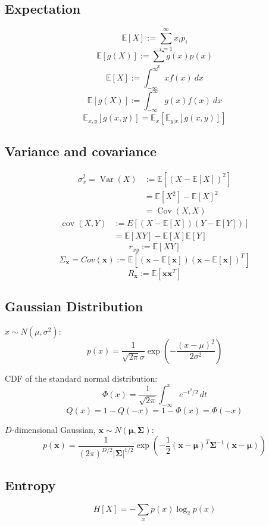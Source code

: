\documentclass{article}
\begin{document}
\begin{multicols}{2}
\subsection{Expectation}
\[\mathbb{E}[X] := \sum_{i=1}^\infty x_i p_i\]
\[\mathbb{E}[g(X)] := \sum_{x} g(x) p(x)\]
\[\mathbb{E}[X] := \int_{-\infty}^\infty x f(x)\ dx\]
\[\mathbb{E}[g(X)] := \int_{-\infty}^\infty g(x) f(x)\ dx\]
\[\mathbb{E}_{x, y}\left[g(x, y)\right] = \mathbb{E}_x\left[\mathbb{E}_{y|x}[g(x, y)]\right]\]

\subsection{Variance and covariance}
\[\begin{split}
	\sigma_x^2 = \operatorname{Var}(X) &:= \mathbb{E}[(X - \mathbb{E}[X])^2] \\
	&= \mathbb{E}[X^2] - \mathbb{E}[X]^2 \\
	&= \operatorname{Cov}(X, X)
\end{split}\]
\[\begin{split}
	\operatorname{cov}(X, Y) &:= E{\left[(X - \mathbb{E}[X])(Y - \mathbb{E}[Y])\right]} \\
	&= \mathbb{E}[X Y] - \mathbb{E}[X] \mathbb{E}[Y]
\end{split}\]
\[r_{xy} := \mathbb{E}[X Y]\]
\[\Sigma_{\symbf{x}} = Cov(\symbf{x}) := \mathbb{E}\left[(\symbf{x} - \mathbb{E}[\symbf{x}])(\symbf{x} - \mathbb{E}[\symbf{x}])^T\right]\]
\[R_{\symbf{x}} := \mathbb{E}[\symbf{x} \symbf{x}^T]\]

\subsection{Gaussian Distribution}
$x \sim N(\mu, \sigma^2)$:
\[p(x) = \frac{1}{\sqrt{2 \pi} \sigma} \exp\left(-\frac{(x-\mu)^2}{2\sigma^2}\right)\]

CDF of the standard normal distribution:
\[\Phi(x) = \frac{1}{\sqrt{2\pi}} \int_{-\infty}^x e^{-t^2/2} \, dt\]
\[Q(x) = 1 - Q(-x) = 1 - \Phi(x) = \Phi(-x)\]

$D$-dimensional Gaussian, $\symbf{x} \sim N(\symbf{\mu}, \symbf{\Sigma})$:
\[p(\symbf{x}) = \frac{1}{(2 \pi)^{D/2} |\symbf{\Sigma}|^{1/2}} \exp\left(-\frac{1}{2}(\symbf{x}-\symbf{\mu})^T \symbf{\Sigma}^{-1} (\symbf{x}-\symbf{\mu}) \right)\]

\subsection{Entropy}
\[H[X] = - \sum_x p(x) \log_2 p(x)\]



\end{multicols}
\end{document}
